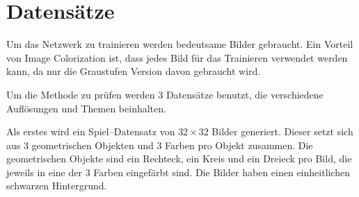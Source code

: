 \section{Datensätze}
Um das Netzwerk zu trainieren werden bedeutsame Bilder gebraucht. Ein Vorteil von Image Colorization ist, dass jedes Bild für das Trainieren
verwendet werden kann, da nur die Graustufen Version davon gebraucht wird.

Um die Methode zu prüfen werden 3 Datensätze benutzt, die verschiedene Auflösungen und Themen beinhalten.

Als erstes wird ein Spiel–Datensatz von $ 32 \times 32 $ Bilder generiert. Dieser setzt sich aus 3 geometrischen Objekten und 3 Farben pro
Objekt zusammen. Die geometrischen Objekte sind ein Rechteck, ein Kreis und ein Dreieck pro Bild, die jeweils in eine der 3 Farben eingefärbt sind.
Die Bilder haben einen einheitlichen schwarzen Hintergrund.

